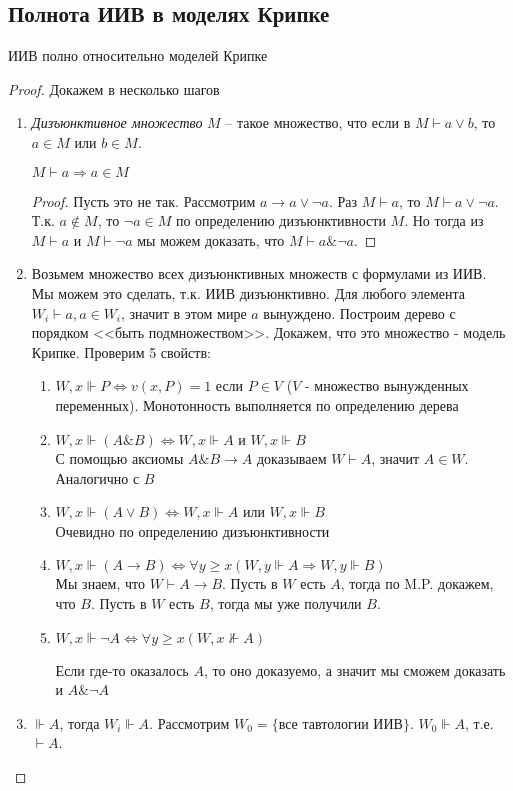 \subsection{Полнота ИИВ в моделях Крипке}
\label{sec-6-4}
\begin{theorem}
ИИВ полно относительно моделей Крипке
\end{theorem}
\begin{proof}
Докажем в несколько шагов
\begin{enumerate}
\item \emph{Дизъюнктивное множество} $M$ -- такое множество, что если в $M \vdash a \vee b$, то $a \in M$ или $b \in M$.
\begin{lemma}
$M \vdash a \Rightarrow a \in M$
\end{lemma}
\begin{proof}
Пусть это не так. Рассмотрим $a \rightarrow a \vee \neg a$. Раз $M \vdash a$, то $M \vdash a \vee \neg a$. Т.к. $a \not \in M$, то $\neg a \in M$ по определению дизъюнктивности $M$. Но тогда из $M \vdash a$ и $M \vdash \neg a$ мы можем доказать, что $M \vdash a \& \neg a$.
\end{proof}
\item Возьмем множество всех дизъюнктивных множеств с формулами из ИИВ. Мы можем это сделать, т.к. ИИВ дизъюнктивно. Для любого элемента $W_{i} \vdash a, a \in W_{i}$, значит в этом мире $a$ вынуждено. Построим дерево с порядком <<быть подмножеством>>. Докажем, что это множество - модель Крипке. Проверим 5 свойств:
\begin{enumerate}
\item $W, x \Vdash P \Leftrightarrow v(x, P) = 1$ если $P \in V$ ($V$ - множество вынужденных переменных). Монотонность выполняется по определению дерева
\item $W, x \Vdash (A \& B) \Leftrightarrow W, x \Vdash A$ и $W, x \Vdash B$\\
С помощью аксиомы $A \& B \rightarrow A$ доказываем $W \vdash A$, значит $A \in W$. Аналогично с $B$ 
\item $W, x \Vdash (A \vee B) \Leftrightarrow W, x \Vdash A$ или $W, x \Vdash B$\\
Очевидно по определению дизъюнктивности
\item $W, x \Vdash (A \rightarrow B) \Leftrightarrow \forall y \geq x (W, y \Vdash A \Rightarrow W, y \Vdash B)$\\
Мы знаем, что $W \vdash A \rightarrow B$. Пусть в $W$ есть $A$, тогда по M.P. докажем, что $B$. Пусть в $W$ есть $B$, тогда мы уже получили $B$.
\item $W, x \Vdash \neg A \Leftrightarrow \forall y \geq x (W, x \not \Vdash A)$

Если где-то оказалось $A$, то оно доказуемо, а значит мы сможем доказать и $A \& \neg A$ 
\end{enumerate}
\item $\Vdash A$, тогда $W_{i} \Vdash A$. Рассмотрим $W_{0} = \lbrace$все тавтологии ИИВ$\rbrace$. $W_{0} \Vdash A$, т.е. $\vdash A$.
\end{enumerate}
\end{proof}

